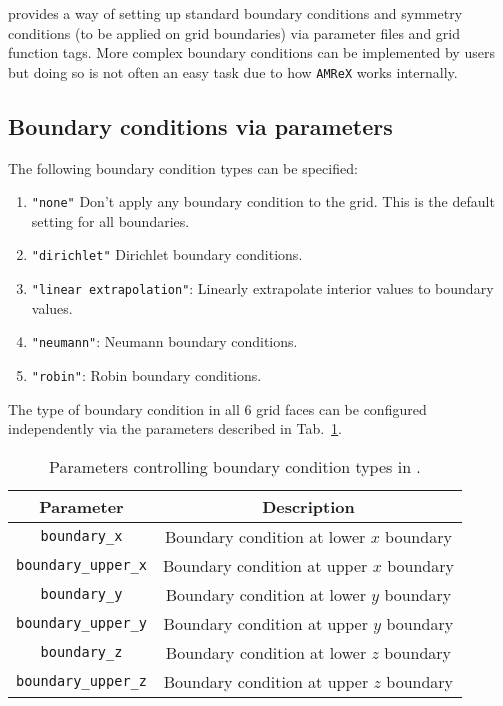\CarpetX\space provides a way of setting up standard boundary conditions and symmetry conditions (to be applied on grid boundaries) via parameter files and grid function tags. More complex boundary conditions can be implemented by users but doing so is not often an easy task due to how \texttt{AMReX} works internally.

\subsection{Boundary conditions via parameters}

The following boundary condition types can be specified:

\begin{enumerate}
    \item \texttt{"none"}\: Don't apply any boundary condition to the grid. This is the default setting for all boundaries.
    \item \texttt{"dirichlet"}\: Dirichlet boundary conditions.
    \item \texttt{"linear extrapolation"}: Linearly extrapolate interior values to boundary values.
    \item \texttt{"neumann"}: Neumann boundary conditions.
    \item \texttt{"robin"}: Robin boundary conditions.
\end{enumerate}

The type of boundary condition in all 6 grid faces can be configured independently via the parameters described in Tab.~\ref{tab:boundary_settings}.

\begin{table}[ht]
    \centering
    \begin{tabular}{cc}
    Parameter                   & Description                             \\\hline\hline
    \texttt{boundary\_x}        & Boundary condition at lower $x$ boundary\\
    \texttt{boundary\_upper\_x} & Boundary condition at upper $x$ boundary\\
    \texttt{boundary\_y}        & Boundary condition at lower $y$ boundary\\
    \texttt{boundary\_upper\_y} & Boundary condition at upper $y$ boundary\\
    \texttt{boundary\_z}        & Boundary condition at lower $z$ boundary\\
    \texttt{boundary\_upper\_z} & Boundary condition at upper $z$ boundary\\\hline\hline
    \end{tabular}
    \caption{Parameters controlling boundary condition types in \CarpetX.}
    \label{tab:boundary_settings}
  \end{table}

